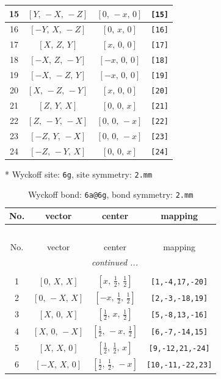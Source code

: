\documentclass[fleqn,8pt]{jsarticle}
\begin{document}
\begin{longtable}{cccc}
15 & $\left[ Y,\, - X,\, - Z \right]$ & $\left[ 0,\, - x,\, 0 \right]$ & {\tt [15]} \\ \hline
16 & $\left[ - Y,\, X,\, - Z \right]$ & $\left[ 0,\, x,\, 0 \right]$ & {\tt [16]} \\ \hline
17 & $\left[ X,\, Z,\, Y \right]$ & $\left[ x,\, 0,\, 0 \right]$ & {\tt [17]} \\ \hline
18 & $\left[ - X,\, Z,\, - Y \right]$ & $\left[ - x,\, 0,\, 0 \right]$ & {\tt [18]} \\ \hline
19 & $\left[ - X,\, - Z,\, Y \right]$ & $\left[ - x,\, 0,\, 0 \right]$ & {\tt [19]} \\ \hline
20 & $\left[ X,\, - Z,\, - Y \right]$ & $\left[ x,\, 0,\, 0 \right]$ & {\tt [20]} \\ \hline
21 & $\left[ Z,\, Y,\, X \right]$ & $\left[ 0,\, 0,\, x \right]$ & {\tt [21]} \\ \hline
22 & $\left[ Z,\, - Y,\, - X \right]$ & $\left[ 0,\, 0,\, - x \right]$ & {\tt [22]} \\ \hline
23 & $\left[ - Z,\, Y,\, - X \right]$ & $\left[ 0,\, 0,\, - x \right]$ & {\tt [23]} \\ \hline
24 & $\left[ - Z,\, - Y,\, X \right]$ & $\left[ 0,\, 0,\, x \right]$ & {\tt [24]} \\
\end{longtable}
* Wyckoff site: {\tt 6g}, site symmetry: {\tt 2.mm}
\renewcommand{\arraystretch}{1.2}
\begin{longtable}{cccc}
\caption{Wyckoff bond: {\tt 6a@6g}, bond symmetry: {\tt 2.mm}}
 \\
 \hline \hline
No. & vector & center & mapping \\ \hline \endfirsthead

\multicolumn{3}{l}{\tablename\ \thetable{}} \\
 \hline \hline
No. & vector & center & mapping \\ \hline \endhead

 \hline \hline
\multicolumn{3}{r}{\footnotesize\it continued ...} \\ \endfoot

 \hline \hline
\multicolumn{3}{r}{} \\ \endlastfoot

1 & $\left[ 0,\, X,\, X \right]$ & $\left[ x,\, \frac{1}{2},\, \frac{1}{2} \right]$ & {\tt [1,-4,17,-20]} \\ \hline
2 & $\left[ 0,\, - X,\, X \right]$ & $\left[ - x,\, \frac{1}{2},\, \frac{1}{2} \right]$ & {\tt [2,-3,-18,19]} \\ \hline
3 & $\left[ X,\, 0,\, X \right]$ & $\left[ \frac{1}{2},\, x,\, \frac{1}{2} \right]$ & {\tt [5,-8,13,-16]} \\ \hline
4 & $\left[ X,\, 0,\, - X \right]$ & $\left[ \frac{1}{2},\, - x,\, \frac{1}{2} \right]$ & {\tt [6,-7,-14,15]} \\ \hline
5 & $\left[ X,\, X,\, 0 \right]$ & $\left[ \frac{1}{2},\, \frac{1}{2},\, x \right]$ & {\tt [9,-12,21,-24]} \\ \hline
6 & $\left[ - X,\, X,\, 0 \right]$ & $\left[ \frac{1}{2},\, \frac{1}{2},\, - x \right]$ & {\tt [10,-11,-22,23]} \\
\end{longtable}
\end{document}
